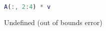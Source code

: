 \begin{lstlisting}[language=Matlab]
A(:, 2:4) * v
\end{lstlisting}

\begin{solution}
Undefined (out of bounds error)
\end{solution}